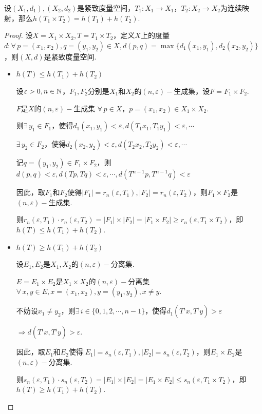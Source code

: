 \begin{theorem}{}
    设$(X_1,d_1),(X_2,d_2)$是紧致度量空间，$T_1:X_1\to X_1$，$T_2:X_2\to X_2$为连续映射，那么$h(T_1\times T_2)=h(T_1)+h(T_2)$.
\end{theorem}
\begin{proof}
    设$X=X_1\times X_2,T=T_1\times T_2$，定义$X$上的度量$d:\forall\, p=(x_1,x_2),q=(y_1,y_2)\in X,d(p,q)=\max\{d_1(x_1,y_1),d_2(x_2,y_2)\}$，则$(X,d)$是紧致度量空间.\par
    \begin{itemize}
        \item $h(T)\leq h(T_1)+h(T_2)$\par
        设$\varepsilon>0,n\in\mathbb{N}$，$F_1,F_2$分别是$X_1$和$X_2$的$(n,\varepsilon)-$生成集，设$F=F_1\times F_2$.
        \begin{claim}{$F$是$X$的$(n,\varepsilon)-$生成集}
            $\forall\, p\in X$，$p=(x_1,x_2)\in X_1\times X_2$.\par
            则$\exists\, y_1\in F_1$，使得$d_1(x_1,y_1)<\varepsilon,d(T_1x_1,T_1y_1)<\varepsilon,\cdots$\par
            $\exists\, y_2\in F_2$，使得$d_2(x_2,y_2)<\varepsilon,d(T_2x_2,T_2y_2)<\varepsilon,\cdots$\par
            记$q=(y_1,y_2)\in F_1\times F_2$，则$d(p,q)<\varepsilon,d(Tp,Tq)<\varepsilon,\cdots,d(T^{n-1}p,T^{n-1}q)<\varepsilon$
        \end{claim}\par
        因此，取$F_1$和$F_2$使得$|F_1|=r_n(\varepsilon,T_1),|F_2|=r_n(\varepsilon,T_2)$，则$F_1\times F_2$是$(n,\varepsilon)-$生成集.\par
        则$r_n(\varepsilon,T_1)\cdot r_n(\varepsilon,T_2)=|F_1|\times|F_2|=|F_1\times F_2|\geq r_n(\varepsilon,T_1\times T_2)$，即$h(T)\leq h(T_1)+h(T_2)$.
        \item $h(T)\geq h(T_1)+h(T_2)$\par
        设$E_1,E_2$是$X_1,X_2$的$(n,\varepsilon)-$分离集.\par
        \begin{claim}{$E=E_1\times E_2$是$X_1\times X_2$的$(n,\varepsilon)-$分离集}
            $\forall\, x,y\in E,x=(x_1,x_2),y=(y_1,y_2),x\neq y$.\par
            不妨设$x_1\neq y_2$，则$\exists\, i\in\{0,1,2,\cdots,n-1\}$，使得$d_1(T^ix,T^iy)>\varepsilon$\par
            $\Rightarrow d(T^ix,T^iy)>\varepsilon$.
        \end{claim}\par
        因此，取$E_1$和$E_2$使得$|E_1|=s_n(\varepsilon,T_1),|E_2|=s_n(\varepsilon,T_2)$，则$E_1\times E_2$是$(n,\varepsilon)-$分离集.\par
        则$s_n(\varepsilon,T_1)\cdot s_n(\varepsilon,T_2)=|E_1|\times|E_2|=|E_1\times E_2|\leq s_n(\varepsilon,T_1\times T_2)$，即$h(T)\geq h(T_1)+h(T_2)$.
    \end{itemize}  
\end{proof}

